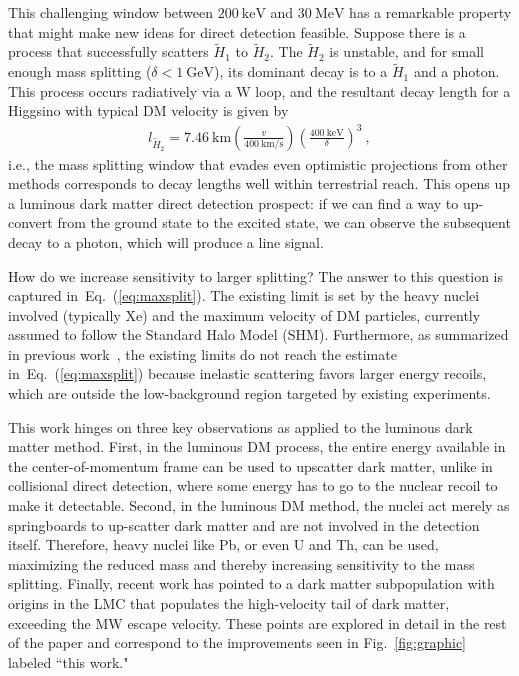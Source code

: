 \documentclass[aps,prd,amsmath,amssymb,10pt,letterpaper,balancelastpage,showpacs,superscriptaddress,nofootinbib,floatfix,notitlepage,longbibliography,twocolumn
]{revtex4-2}
\newcommand{\Eq}[1]{Eq.~(#1)}
\newcommand{\kms}{\text{km}/\text{s}}
\newcommand{\lH}{l_{\tilde{H}_2}}
\begin{document}
This challenging window between $200~\textrm{keV}$ and $30~\textrm{MeV}$ has a remarkable property that might make new ideas for direct detection feasible. Suppose there is a process that successfully scatters $\tilde{H}_1$ to $\tilde{H}_2$. The $\tilde{H}_2$ is unstable, and for small enough mass splitting ($\delta < 1~\textrm{GeV}$), its dominant decay is to a $\tilde{H}_1$ and a photon. This process occurs radiatively via a W loop, and the resultant decay length for a Higgsino with typical DM velocity is given by~\cite{RadiativeDecay}
\begin{align} \label{eq: decay length}
    \lH=7.46~\text{km} \left(\frac{v}{400~\kms}\right) \left(\frac{400~\text{keV}}{\delta}\right)^3 ~, 
\end{align}
i.e., the mass splitting window that evades even optimistic projections from other methods corresponds to decay lengths well within terrestrial reach. This opens up a luminous dark matter direct detection prospect: if we can find a way to up-convert from the ground state to the excited state, we can observe the subsequent decay to a photon, which will produce a line signal. 

How do we increase sensitivity to larger splitting? The answer to this question is captured in~\Eq{\ref{eq:maxsplit}}. The existing limit is set by the heavy nuclei involved (typically Xe) and the maximum velocity of DM particles, currently assumed to follow the Standard Halo Model (SHM). Furthermore, as summarized in previous work~\cite{InelasticFrontier}, the existing limits do not reach the estimate in~\Eq{\ref{eq:maxsplit}} because inelastic scattering favors larger energy recoils, which are outside the low-background region targeted by existing experiments.

This work hinges on three key observations as applied to the luminous dark matter method. First, in the luminous DM process, the entire energy available in the center-of-momentum frame can be used to upscatter dark matter, unlike in collisional direct detection, where some energy has to go to the nuclear recoil to make it detectable. Second, in the luminous DM method, the nuclei act merely as springboards to up-scatter dark matter and are not involved in the detection itself. Therefore, heavy nuclei like Pb, or even U and Th, can be used, maximizing the reduced mass and thereby increasing sensitivity to the mass splitting. Finally, recent work has pointed to a dark matter subpopulation with origins in the LMC that populates the high-velocity tail of dark matter, exceeding the MW escape velocity. These points are explored in detail in the rest of the paper and correspond to the improvements seen in Fig.~\ref{fig:graphic} labeled ``this work."
\end{document}
